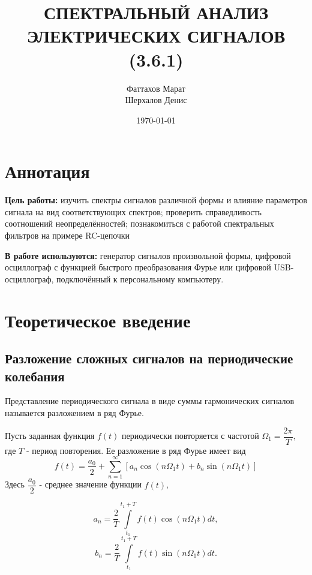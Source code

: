 \documentclass[a4paper,12pt]{article}
\title{СПЕКТРАЛЬНЫЙ АНАЛИЗ ЭЛЕКТРИЧЕСКИХ СИГНАЛОВ (3.6.1)}
\author{Фаттахов Марат\\
Шерхалов Денис}
\date{\today}
\theoremstyle{definition}
\begin{document}
	
\maketitle
\section{Аннотация}
\indent
\indent \textbf{Цель работы:} изучить спектры сигналов различной формы и влияние параметров сигнала
на вид соответствующих спектров; проверить справедливость соотношений неопределённостей; познакомиться с работой спектральных фильтров на примере RC-цепочки

\indent \textbf{В работе используются:} генератор сигналов произвольной формы, цифровой осциллограф с функцией быстрого преобразования Фурье или цифровой USB-осциллограф, подключённый к персональному компьютеру.





\section{Теоретическое введение}

\subsection*{Разложение сложных сигналов на периодические колебания}
Представление периодического сигнала в виде суммы гармонических сигналов называется разложением в ряд Фурье.
	
	Пусть заданная функция $f(t)$ периодически повторяется с частотой $\Omega_{1}=\dfrac{2\pi}{T},$ где $T$ - период повторения. Ее разложение в ряд Фурье имеет вид
\begin{equation}
    f(t)=\dfrac{a_{0}}{2}+ \sum\limits_{n=1}^\infty [a_{n}\cos(n \Omega_{1}t)+b_{n}\sin(n \Omega_{1} t) ]
\label{eq1}
\end{equation}
		Здесь $\dfrac{a_{0}}{2}$ - среднее значение функции $f(t)$,
	
\begin{equation}
     a_{n}=\dfrac{2}{T}\int\limits_{t_{1}}^{t_{1}+T}f(t)\cos(n \Omega_{1} t)dt, 
     \label{eq2}
\end{equation}
\begin{equation}
    b_{n}=\dfrac{2}{T}\int\limits_{t_{1}}^{t_{1}+T}f(t)\sin(n \Omega_{1} t)dt.
    \label{eq3}
\end{equation}
  
\end{document}

